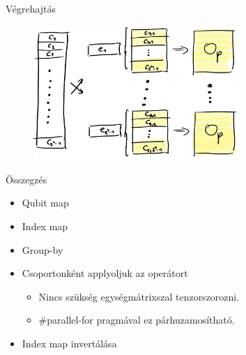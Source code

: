 \documentclass[aspectratio=169]{beamer}
\begin{document}
\begin{frame}{Végrehajtás}

\begin{figure}[H]
    \centering
    \includegraphics[width=0.7\textwidth]{figures/vegrehajtas.jpg}
\end{figure}

\end{frame}

\begin{frame}{Összegzés}

\begin{itemize}
    \item Qubit map
    \item Index map
    \item Group-by
    \item Csoportonként applyoljuk az operátort
    \begin{itemize}
        \item Nincs szükség egységmátrixszal tenzorszorozni.
        \item \#parallel-for pragmával ez párhuzamosítható.
    \end{itemize}
    \item Index map invertálása
\end{itemize}

\end{frame}
\end{document}
